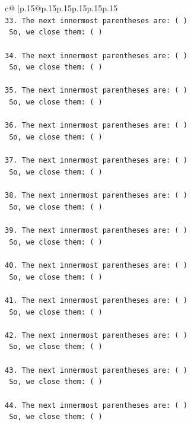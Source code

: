 \documentclass{article}
\begin{document}
{\begin{supertabular}{c@{$\;$}|p{.15\linewidth}@{}p{.15\linewidth}p{.15\linewidth}p{.15\linewidth}p{.15\linewidth}p{.15\linewidth}}
{{{\\ 
\texttt{33. The next innermost parentheses are: ( ) } \\
\texttt{    So, we close them: ( ) } \\
\\ 
\texttt{34. The next innermost parentheses are: ( ) } \\
\texttt{    So, we close them: ( ) } \\
\\ 
\texttt{35. The next innermost parentheses are: ( ) } \\
\texttt{    So, we close them: ( ) } \\
\\ 
\texttt{36. The next innermost parentheses are: ( ) } \\
\texttt{    So, we close them: ( ) } \\
\\ 
\texttt{37. The next innermost parentheses are: ( ) } \\
\texttt{    So, we close them: ( ) } \\
\\ 
\texttt{38. The next innermost parentheses are: ( ) } \\
\texttt{    So, we close them: ( ) } \\
\\ 
\texttt{39. The next innermost parentheses are: ( ) } \\
\texttt{    So, we close them: ( ) } \\
\\ 
\texttt{40. The next innermost parentheses are: ( ) } \\
\texttt{    So, we close them: ( ) } \\
\\ 
\texttt{41. The next innermost parentheses are: ( ) } \\
\texttt{    So, we close them: ( ) } \\
\\ 
\texttt{42. The next innermost parentheses are: ( ) } \\
\texttt{    So, we close them: ( ) } \\
\\ 
\texttt{43. The next innermost parentheses are: ( ) } \\
\texttt{    So, we close them: ( ) } \\
\\ 
\texttt{44. The next innermost parentheses are: ( ) } \\
\texttt{    So, we close them: ( ) } \\
}}}
\end{supertabular}}
\end{document}

